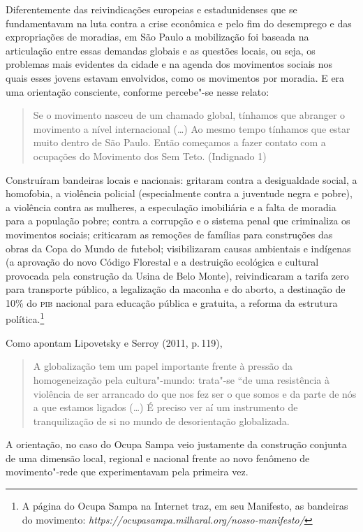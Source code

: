 Diferentemente das reivindicações europeias e estadunidenses que se
fundamentavam na luta contra a crise econômica e pelo fim do desemprego
e das expropriações de moradias, em São Paulo a mobilização foi baseada
na articulação entre essas demandas globais e as questões locais, ou
seja, os problemas mais evidentes da cidade e na agenda dos movimentos
sociais nos quais esses jovens estavam envolvidos, como os movimentos
por moradia. E era uma orientação consciente, conforme percebe"-se nesse
relato:

\begin{quote}
Se o movimento nasceu de um chamado global, tínhamos que abranger o
movimento a nível internacional (\ldots{}) Ao mesmo tempo tínhamos que estar
muito dentro de São Paulo. Então começamos a fazer contato com a
ocupações do Movimento dos Sem Teto. (Indignado 1)
\end{quote}

Construíram bandeiras locais e nacionais: gritaram contra a desigualdade
social, a homofobia, a violência policial (especialmente contra a
juventude negra e pobre), a violência contra as mulheres, a especulação
imobiliária e a falta de moradia para a população pobre; contra a
corrupção e o sistema penal que criminaliza os movimentos sociais;
criticaram as remoções de famílias para construções das obras da Copa do
Mundo de futebol; visibilizaram causas ambientais e indígenas (a
aprovação do novo Código Florestal e a destruição ecológica e cultural
provocada pela construção da Usina de Belo Monte), reivindicaram a
tarifa zero para transporte público, a legalização da maconha e do
aborto, a destinação de 10\% do \textsc{pib} nacional para educação pública e
gratuita, a reforma da estrutura política.\footnote{A página do Ocupa
  Sampa na Internet traz, em seu Manifesto, as bandeiras do movimento:
  \emph{https://ocupasampa.milharal.org/nosso-manifesto/}}

Como apontam Lipovetsky e Serroy (2011, p.\,119),

\begin{quote}
A globalização tem um papel importante frente à pressão da
homogeneização pela cultura"-mundo: trata"-se ``de uma resistência à
violência de ser arrancado do que nos fez ser o que somos e da parte de
nós a que estamos ligados (\ldots{}) É preciso ver aí um instrumento de
tranquilização de si no mundo de desorientação globalizada.
\end{quote}

A orientação, no caso do Ocupa Sampa veio justamente da construção
conjunta de uma dimensão local, regional e nacional frente ao novo
fenômeno de movimento"-rede que experimentavam pela primeira vez.

